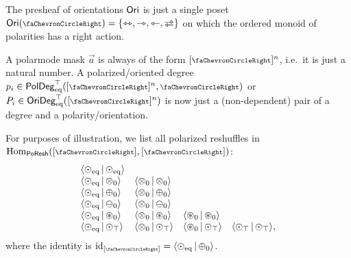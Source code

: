 \documentclass[a4paper]{memoir}
\begin{document}
The presheaf of orientations ${\mathsf{Ori}}$ is just a single poset $\oripsh(\ypolar) = \accol{\equijetsym, \jetsym, \tejsym, \infrajetsym}$ on which the ordered monoid of polarities has a right action.

A polarmode mask $\vec a$ is always of the form $[\ypolar]^n$, i.e.\ it is just a natural number.
A polarized/oriented degree $\pdeg p i \in \poldegeqtop([\ypolar]^n, \ypolar)$ or $\odeg P i \in \oridegeqtop([\ypolar]^n)$ is now just a (non-dependent) pair of a degree and a polarity/orientation.

For purposes of illustration, we list all polarized reshuffles in $\Hom_\poreshcat([\ypolar], [\ypolar])$:
\[
	\begin{array}{l l l l}
		\mathopen{}\left\langle {{\odot}}_{{\mathrm{eq}}} \,\middle|\, {{\odot}}_{{\mathrm{eq}}} \right\rangle\mathclose{} \\
		\mathopen{}\left\langle {{\odot}}_{{\mathrm{eq}}} \,\middle|\, {{\otimes}}_{0} \right\rangle\mathclose{} &
		\mathopen{}\left\langle {{\otimes}}_{0} \,\middle|\, {{\otimes}}_{0} \right\rangle\mathclose{} \\
		\mathopen{}\left\langle {{\odot}}_{{\mathrm{eq}}} \,\middle|\, {{\oplus}}_{0} \right\rangle\mathclose{} &
		\mathopen{}\left\langle {{\otimes}}_{0} \,\middle|\, {{\oplus}}_{0} \right\rangle\mathclose{} \\
		\mathopen{}\left\langle {{\odot}}_{{\mathrm{eq}}} \,\middle|\, {{\ominus}}_{0} \right\rangle\mathclose{} &
		\mathopen{}\left\langle {{\otimes}}_{0} \,\middle|\, {{\ominus}}_{0} \right\rangle\mathclose{} \\
		\mathopen{}\left\langle {{\odot}}_{{\mathrm{eq}}} \,\middle|\, {{\oast}}_{0} \right\rangle\mathclose{} &
		\mathopen{}\left\langle {{\otimes}}_{0} \,\middle|\, {{\oast}}_{0} \right\rangle\mathclose{} &
		\mathopen{}\left\langle {{\oast}}_{0} \,\middle|\, {{\oast}}_{0} \right\rangle\mathclose{} \\
		\mathopen{}\left\langle {{\odot}}_{{\mathrm{eq}}} \,\middle|\, {{\odot}}_{\top} \right\rangle\mathclose{} &
		\mathopen{}\left\langle {{\otimes}}_{0} \,\middle|\, {{\odot}}_{\top} \right\rangle\mathclose{} &
		\mathopen{}\left\langle {{\oast}}_{0} \,\middle|\, {{\odot}}_{\top} \right\rangle\mathclose{} &
		\mathopen{}\left\langle {{\odot}}_{\top} \,\middle|\, {{\odot}}_{\top} \right\rangle\mathclose{},
	\end{array}
\]
where the identity is $\id_{[\ypolar]} = \reshlist{\pdeg \nonpol \eqtydeg}{\pdeg \pospol 0}$.
\end{document}
